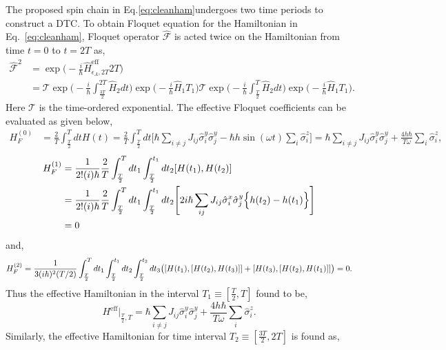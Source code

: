 \documentclass[%
nofootinbib,
reprint,
superscriptaddress,
amsmath,amssymb,showkeys,
aps,
prb,
]{revtex4-2}
\begin{document}
	The proposed spin chain in Eq.\eqref{eq:cleanham}undergoes two time periods to construct a DTC. To obtain Floquet equation for the Hamiltonian in Eq.~\ref{eq:cleanham}, Floquet operator $\hat{\mathcal{F}}$ is acted twice on the Hamiltonian from time $t=0$ to $t=2T$ as,
	\begin{align*}
		\hat{\mathcal{F}}^2 &= \exp\Big(-\frac{i}{\hbar}\hat{H}_{\epsilon_A, 2T}^{\mathrm{eff}}2T\Big)\\ 
		&= \mathcal{T}\exp\Big(-\frac{i}{\hbar}\int_{\frac{3T}{2}}^{2T}\hat{H}_2 dt\Big)
		\exp\Big(-\frac{i}{\hbar}\hat{H}_1T_1\Big)\mathcal{T}\exp\Big(-\frac{i}{\hbar}\int_{\frac{T}{2}}^{T}\hat{H}_2 dt\Big)\exp\Big(-\frac{i}{\hbar}\hat{H}_1T_1\Big).
	\end{align*}
	Here $\mathcal{T}$ is the time-ordered exponential. The effective Floquet coefficients can be evaluated as given below,	
	\begin{align}
		H_F^{(0)} &= \frac{2}{T} \int_{\frac{T}{2}}^{T} dt H(t) = \frac{2}{T} \int_{\frac{T}{2}}^{T} dt 
		\Bigg[\hbar\sum_{i\neq j} J_{ij} \hat{\sigma}^y_i \hat{\sigma}^y_j -\hbar h\sin(\omega t) \sum_i\hat{\sigma}^z_i\Bigg]= \hbar\sum_{i\neq j} J_{ij} \hat{\sigma}^y_i \hat{\sigma}^y_j + \frac{4h\hbar}{T \omega}\sum_i\hat{\sigma}^z_i,
	\end{align}	
	\begin{align}
		H_F^{(1)} &= \frac{1}{2!(i)\hbar} \frac{2}{T} \int_{\frac{T}{2}}^{T} dt_1  \int_{\frac{T}{2}}^{t_1} dt_2 \comm{H(t_1)}{H(t_2)}\nonumber\\
		&= \frac{1}{2!(i)\hbar} \frac{2}{T}\int_{\frac{T}{2}}^{T} dt_1 \int_{\frac{T}{2}}^{t_1} dt_2\Bigg[2i\hbar\sum_{ij}^{}J_{ij}\hat{\sigma}^x_i\hat{\sigma}^y_j\Big\{h(t_2) -h(t_1)\Big\}\Bigg]\nonumber\\
		&= 0
	\end{align}	
	and,
	\begin{equation}
		H_F^{(2)} = \frac{1}{3(i\hbar)^2 (T/2)} \int_{\frac{T}{2}}^{T} dt_1  \int_{{\frac{T}{2}}}^{t_1} dt_2 \int_{\frac{T}{2}}^{t_2} dt_3 \big(\comm{H(t_1)}{\comm{H(t_2)}{H(t_3)}} + \comm{H(t_3)}{\comm{H(t_2)} {H(t_1)}} \big)= 0.    
	\end{equation}
	Thus the effective Hamiltonian in the interval $T_1\equiv[\frac{T}{2}, T]$ found to be,	
	\begin{equation}
		H^{\mathrm{eff}}\vert_{\frac{T}{2}, T} =  \hbar\sum_{i\neq j} J_{ij} \hat{\sigma}^y_i \hat{\sigma}^y_{j} + \frac{4h\hbar}{T \omega}\sum_i\hat{\sigma}^z_i.
	\end{equation} 	
	Similarly, the effective Hamiltonian for time interval $T_2\equiv[\frac{3T}{2}, 2T]$ is found as,	
\end{document}
